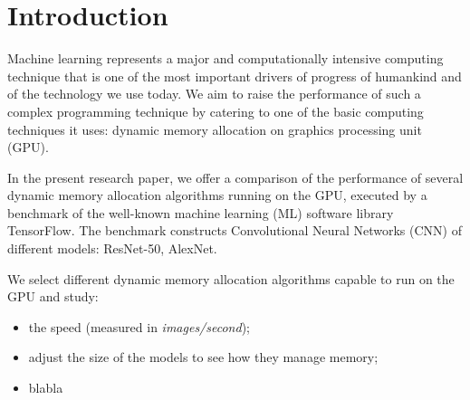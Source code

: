 \documentclass[12pt,twoside]{article}
\begin{document}
\clearpage




\section{Introduction}
\label{sect:introduction}




Machine learning represents a major and computationally intensive computing technique that is one of the most important drivers of progress of humankind and of the technology we use today. We aim to raise the performance of such a complex programming technique by catering to one of the basic computing techniques it uses: dynamic memory allocation on graphics processing unit (GPU).


In the present research paper, we offer a comparison of the performance of several dynamic memory allocation algorithms running on the GPU, executed by a benchmark of the well-known machine learning (ML) software library TensorFlow. The benchmark constructs Convolutional Neural Networks (CNN) of different models: ResNet-50, AlexNet.

We select different dynamic memory allocation algorithms capable to run on the GPU and study:
\begin{itemize}
\item the speed (measured in \textit{images/second});
\item adjust the size of the models to see how they manage memory;
\item blabla
\end{itemize}
\end{document}
